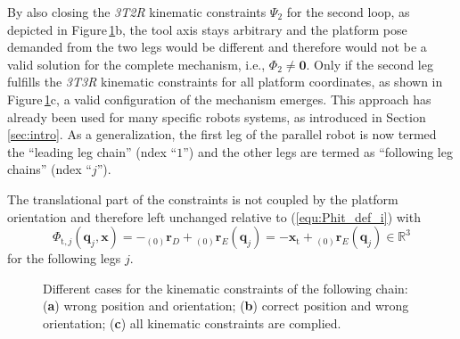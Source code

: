 \documentclass[robotics,article,accept,moreauthors,pdftex]{Definitions/mdpi}
\newcommand{\bm}[1]{\boldsymbol{#1}}
\newcommand{\ortvek}[4]{{ }_{(#1)}{\boldsymbol{#2}}^{#3}_{#4} }
\let\Phi\varPhi
\let\Psi\varPsi
\begin{document}
%
By also closing the \emph{3T2R} kinematic constraints $\bm{\Psi}_2$ for the second loop, as depicted in Figure\,\ref{fig:pkm_constr_rot_follow}b, the tool axis stays arbitrary and the platform pose demanded from the two legs would be different and therefore would not be a valid solution for the complete mechanism, i.e., $\bm{\Phi}_2 \ne \bm{0}$.
Only if the second leg fulfills the \emph{3T3R} kinematic constraints for all platform coordinates, as shown in Figure\,\ref{fig:pkm_constr_rot_follow}c, a valid configuration of the mechanism emerges.
This approach has already been used for many specific robots systems, as introduced in Section\,\ref{sec:intro}.
As a generalization, the first leg of the parallel robot is now termed the ``leading leg chain'' (ndex ``$1$'') and the other legs are termed as ``following leg chains'' (ndex ``$j$'').

The translational part of the constraints is not coupled by the platform orientation and therefore left unchanged relative to (\ref{equ:Phit_def_i}) with
%
\begin{equation}
\bm{\Phi}_{\mathrm{t},j}(\bm{q}_j,\bm{x})
= 
- \ortvek{0}{r}{}{D} + \ortvek{0}{r}{}{E}(\bm{q}_j)
=
- \bm{x}_{\mathrm{t}} + \ortvek{0}{r}{}{E}(\bm{q}_j) \in {\mathbb{R}}^{3}
\label{equ:Phit_def_j}
\end{equation}
%
for the following legs $j$.

\begin{figure}[H]
    
    \caption{Different cases for the kinematic constraints of the following chain: (\textbf{a}) wrong position and orientation; (\textbf{b}) correct position and wrong orientation; (\textbf{c}) all kinematic constraints are complied.}
    \label{fig:pkm_constr_rot_follow}
\end{figure} 
\end{document}
